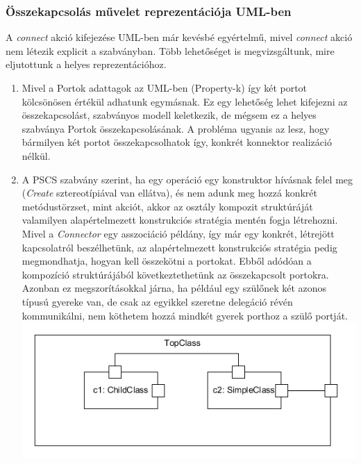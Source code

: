 \documentclass[a4paper,12pt]{report}
\begin{document}
\subsubsection{Összekapcsolás művelet reprezentációja UML-ben}
A \textit{connect} akció kifejezése UML-ben már kevésbé egyértelmű, mivel \textit{connect} akció nem létezik explicit a szabványban. Több lehetőséget is megvizsgáltunk, mire eljutottunk a helyes reprezentációhoz.
\begin{enumerate}
\item Mivel a Portok adattagok az UML-ben (Property-k) így két portot kölcsönösen értékül adhatunk egymásnak. Ez egy lehetőség lehet kifejezni az összekapcsolást, szabványos modell keletkezik, de mégsem ez a helyes szabványa Portok összekapcsolásának. A probléma ugyanis az lesz, hogy bármilyen két portot összekapcsolhatok így, konkrét konnektor realizáció nélkül.
\item A PSCS szabvány szerint, ha egy operáció egy konstruktor hívásnak felel meg (\textit{Create} sztereotípiával van ellátva), és nem adunk meg hozzá konkrét metódustörzset, mint akciót, akkor az osztály kompozit struktúráját valamilyen alapértelmezett konstrukciós stratégia mentén fogja létrehozni. Mivel a \textit{Connector} egy asszociáció példány, így már egy konkrét, létrejött kapcsolatról beszélhetünk, az alapértelmezett konstrukciós stratégia pedig megmondhatja, hogyan kell összekötni a portokat. Ebből adódóan a kompozíció struktúrájából következtethetünk az összekapcsolt portokra. Azonban ez megszorításokkal járna, ha például egy szülőnek két azonos típusú gyereke van, de csak az egyikkel szeretne delegáció révén kommunikálni, nem köthetem hozzá mindkét gyerek porthoz a szülő portját.  \\
\includegraphics[scale=0.8]{preconnect_problem.png}

\end{enumerate}
\end{document}

